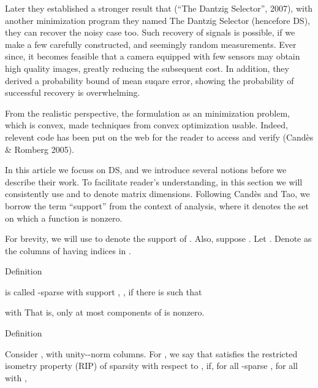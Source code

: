 Later they established a stronger result that (``The Dantzig Selector'', 2007), with another  minimization program they named The Dantzig Selector (hencefore DS), they can recover the noisy case too.
Such recovery of signals is possible, if we make a few carefully constructed, and seemingly random measurements.
Ever since, it becomes feasible that a camera equipped with few sensors may obtain high quality images, greatly reducing the subsequent cost.
In addition, they derived a probability bound of mean suqare error, showing the probability of successful recovery is overwhelming.

From the realistic perspective, the formulation as an  minimization problem, which is convex, made techniques from convex optimization usable.
Indeed, relevent code has been put on the web for the reader to access and verify (Cand\`es \& Romberg 2005).

In this article we focuss on DS, and we introduce several notions before we describe their work.
To facilitate reader's understanding, in this section we will consistently use  and  to denote matrix dimensions.
Following Cand\`es and Tao, we borrow the term ``support'' from the context of analysis, where it denotes the set on which a function is nonzero.

For brevity, we will use  to denote the support of .
Also, suppose .
Let .
Denote as  the columns of  having indices in .

\Result
{Definition}
{
 is called -sparse with support , , if there is  such that

with
That is, only at most  components of  is nonzero.
}

\Result
{Definition}
{
Consider , with unity--norm columns.
For , we say that  satisfies the restricted isometry property (RIP) of sparsity  with respect to , if, for all -sparse , for all  with ,

}

